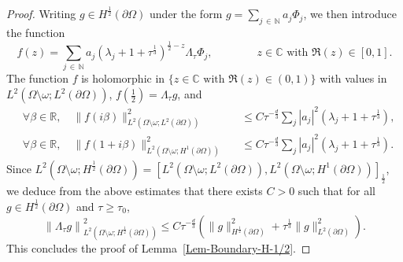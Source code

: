 \documentclass[AHL,Unicode,longabstracts]{cedram}
\newcommand*\R{\mathbb{R}}
\newcommand*\N{\mathbb{N}}
\newcommand*\C{\mathbb{C}}
\newcommand*\ds{\displaystyle}
\renewcommand{\leq}{\leqslant}
\renewcommand{\geq}{\geqslant}
\let\oldforall\forall
\renewcommand*{\forall}{\mathrel{\oldforall}}
\begin{document}
\begin{proof}
Writing $g \in H^{\frac{1}{2}}(\partial \Omega)$ under the form $g = \sum_{j\,\in\,\N} a_j \Phi_j$, we then introduce the function
\[
f(z) = \sum_{j\,\in\,\N} a_j (\lambda_j +1 + \tau^{\frac{1}{3}})^{\frac{1}{2} - z} \Lambda_\tau \Phi_j,
\qquad \qquad z \in \C \text{ with } \Re(z) \in [0,1].
\]
The function $f$ is holomorphic in $\{z \in \C \text{ with } \Re(z) \in (0,1)\}$ with values in $L^2(\Omega \setminus\omega; L^2(\partial \Omega))$, $f(\frac{1}{2}) = \Lambda_\tau g$, and
\begin{align*}
& \forall \beta \in \R,\quad
\ds \| f(i \beta) \|_{L^2\left(\Omega \setminus\omega; L^2(\partial \Omega)\right)}^2 &&\leq C \tau^{-\frac{d}{3}} \sum_{j} |a_j|^2 \left(\lambda_j + 1+ \tau^{\frac{1}{3}}\right),
\\
& \forall \beta \in \R,\quad
\ds\| f(1+ i \beta) \|_{L^2\left(\Omega \setminus\omega; H^1(\partial \Omega)\right)}^2
&&\leq C \tau^{-\frac{d}{3}}
\sum_{j} |a_j|^2 \left(\lambda_j + 1+ \tau^{\frac{1}{3}}\right).
\end{align*}
Since $L^2(\Omega \setminus\omega; H^{\frac{1}{2}}(\partial \Omega)) = [L^2(\Omega \setminus\omega; L^2(\partial \Omega)), L^2(\Omega \setminus\omega; H^1(\partial \Omega))]_{\frac{1}{2}}$, we deduce from the above estimates that there exists $C>0$ such that for all $g \in H^{\frac{1}{2}}(\partial \Omega)$ and $\tau \geq \tau_0$,
\[
\left\| \Lambda_\tau g\right\|_{L^2\left(\Omega \setminus\omega; H^{\frac{1}{2}}(\partial \Omega)\right) }^2
\leq C \tau^{-\frac{d}{3}} \left(\| g \|_{H^{\frac{1}{2}}(\partial \Omega)}^2 + \tau^{\frac{1}{3}} \| g \|_{L^2(\partial \Omega)}^2\right).
\]
This concludes the proof of Lemma~\ref{Lem-Boundary-H-1/2}.
\end{proof}

\vspace*{45pt}




\end{document}
